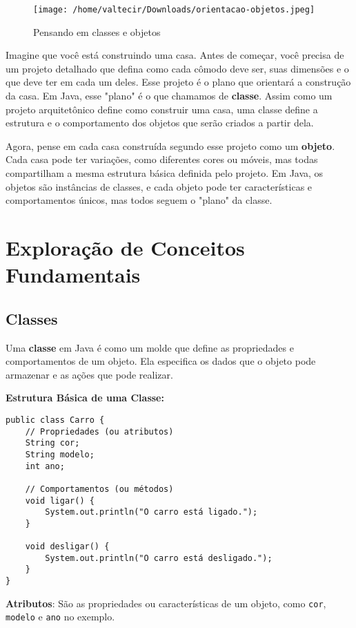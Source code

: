 \documentclass[a4paper,12pt]{book}
\begin{document}
\begin{figure}[H]
    \centering
    \texttt{[image: /home/valtecir/Downloads/orientacao-objetos.jpeg]}
    \caption{Pensando em classes e objetos}
    \label{fig:exemplo}
\end{figure}

Imagine que você está construindo uma casa. Antes de começar, você precisa de um projeto detalhado que defina como cada cômodo deve ser, suas dimensões e o que deve ter em cada um deles. Esse projeto é o plano que orientará a construção da casa. Em Java, esse "plano" é o que chamamos de \textbf{classe}. Assim como um projeto arquitetônico define como construir uma casa, uma classe define a estrutura e o comportamento dos objetos que serão criados a partir dela.

Agora, pense em cada casa construída segundo esse projeto como um \textbf{objeto}. Cada casa pode ter variações, como diferentes cores ou móveis, mas todas compartilham a mesma estrutura básica definida pelo projeto. Em Java, os objetos são instâncias de classes, e cada objeto pode ter características e comportamentos únicos, mas todos seguem o "plano" da classe.

\section{Exploração de Conceitos Fundamentais}

\subsection{Classes}

Uma \textbf{classe} em Java é como um molde que define as propriedades e comportamentos de um objeto. Ela especifica os dados que o objeto pode armazenar e as ações que pode realizar.

\textbf{Estrutura Básica de uma Classe:}

\begin{verbatim}
public class Carro {
    // Propriedades (ou atributos)
    String cor;
    String modelo;
    int ano;

    // Comportamentos (ou métodos)
    void ligar() {
        System.out.println("O carro está ligado.");
    }

    void desligar() {
        System.out.println("O carro está desligado.");
    }
}
\end{verbatim}

\textbf{Atributos}: São as propriedades ou características de um objeto, como \texttt{cor}, \texttt{modelo} e \texttt{ano} no exemplo.
\end{document}
